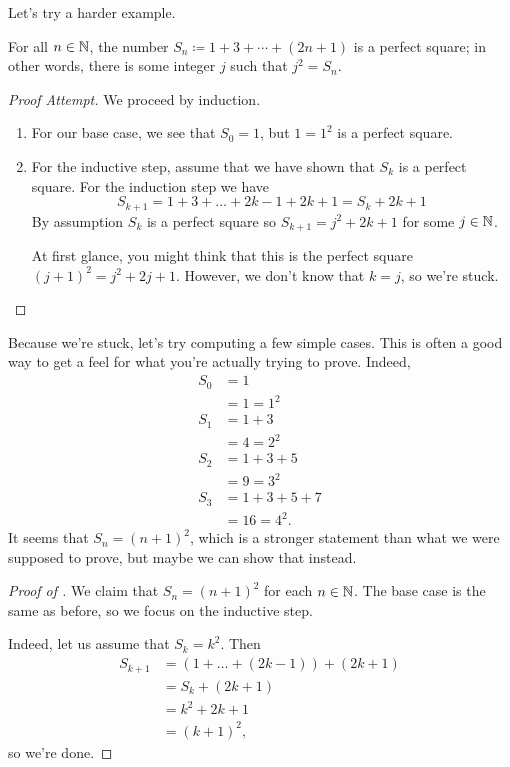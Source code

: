 \documentclass[../main.tex]{subfiles}
\begin{document}
Let's try a harder example.
\begin{example} \label{exe:perfect-square}
    For all $n\in\mathbb N$, the number $S_n\coloneqq1+3+\cdots+(2n+1)$ is a perfect square; in other words, there is some integer $j$ such that $j^2 = S_n$.
\end{example}
\begin{proof}[Proof Attempt]
    We proceed by induction.
    \begin{enumerate}
        \item For our base case, we see that $S_0=1$, but $1=1^2$ is a perfect square.
        \item For the inductive step, assume that we have shown that $S_k$ is a perfect square. For the induction step we have 
        \[S_{k+1}=1+3+\ldots+2k-1+2k+1=S_k+2k+1 \]
        By assumption $S_k$ is a perfect square so $S_{k+1}=j^2+2k+1$ for some $j\in \mathbb N$.
        
        At first glance, you might think that this is the perfect square $(j+1)^2 = j^2 + 2j + 1$. However, we don't know that $k = j$, so we're stuck.
        \qedhere
    \end{enumerate}
\end{proof}
Because we're stuck, let's try computing a few simple cases. This is often a good way to get a feel for what you're actually trying to prove. Indeed,
\begin{align*}
    S_0 &= 1 \\
        &= 1 = 1^2 \\
    S_1 &= 1 + 3 \\
        &= 4 = 2^2 \\
    S_2 &= 1 + 3 + 5 \\
        &= 9 = 3^2 \\
    S_3 &= 1 + 3 + 5 + 7 \\
        &= 16 = 4^2.
\end{align*}
It seems that $S_n = (n+1)^2$, which is a stronger statement than what we were supposed to prove, but maybe we can show that instead.
\begin{proof}[Proof of ]
    We claim that $S_n=(n+1)^2$ for each $n\in\mathbb N$. The base case is the same as before, so we focus on the inductive step.
    
    Indeed, let us assume that $S_k = k^2$. Then
    \begin{align*}
        S_{k+1} &= (1 + \dots + (2k - 1)) + (2k + 1) \\
            &= S_k + (2k + 1) \\
            &= k^2 + 2k + 1 \\
            &= (k+1)^2,
    \end{align*} 
    so we're done.
\end{proof}
\end{document}
